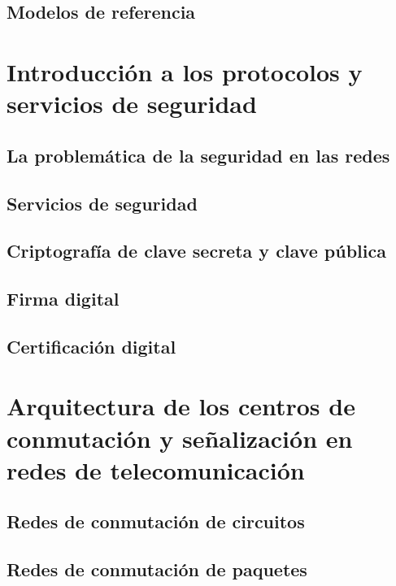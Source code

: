 \documentclass[a4paper]{book}
\numberwithin{figure}{chapter}
\numberwithin{equation}{subsection}
\begin{document}
\section{Modelos de referencia} \label{sec:modelos_de_referencia}





\chapter{Introducción a los protocolos y servicios de seguridad}


\section{La problemática de la seguridad en las redes}

\section{Servicios de seguridad}

\section{Criptografía de clave secreta y clave pública}

\section{Firma digital}

\section{Certificación digital}




\chapter{Arquitectura de los centros de conmutación y señalización en redes de telecomunicación}


\section{Redes de conmutación de circuitos}

\section{Redes de conmutación de paquetes}
\end{document}
